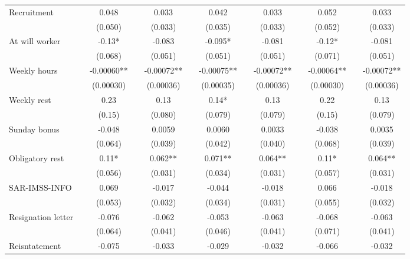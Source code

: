 \begin{tabular}{lcccccccccccc}
Recruitment &       & 0.048 &       & 0.033 &       & 0.042 &       & 0.033 &       & 0.052 &       & 0.033 \\
      &       & (0.050) &       & (0.033) &       & (0.035) &       & (0.033) &       & (0.052) &       & (0.033) \\
At will worker &       & -0.13* &       & -0.083 &       & -0.095* &       & -0.081 &       & -0.12* &       & -0.081 \\
      &       & (0.068) &       & (0.051) &       & (0.051) &       & (0.051) &       & (0.071) &       & (0.051) \\
Weekly hours &       & -0.00060** &       & -0.00072** &       & -0.00075** &       & -0.00072** &       & -0.00064** &       & -0.00072** \\
      &       & (0.00030) &       & (0.00036) &       & (0.00035) &       & (0.00036) &       & (0.00030) &       & (0.00036) \\
Weekly rest &       & 0.23  &       & 0.13  &       & 0.14* &       & 0.13  &       & 0.22  &       & 0.13 \\
      &       & (0.15) &       & (0.080) &       & (0.079) &       & (0.079) &       & (0.15) &       & (0.079) \\
Sunday bonus &       & -0.048 &       & 0.0059 &       & 0.0060 &       & 0.0033 &       & -0.038 &       & 0.0035 \\
      &       & (0.064) &       & (0.039) &       & (0.042) &       & (0.040) &       & (0.068) &       & (0.039) \\
Obligatory rest &       & 0.11* &       & 0.062** &       & 0.071** &       & 0.064** &       & 0.11* &       & 0.064** \\
      &       & (0.056) &       & (0.031) &       & (0.034) &       & (0.031) &       & (0.057) &       & (0.031) \\
SAR-IMSS-INFO &       & 0.069 &       & -0.017 &       & -0.044 &       & -0.018 &       & 0.066 &       & -0.018 \\
      &       & (0.053) &       & (0.032) &       & (0.034) &       & (0.031) &       & (0.055) &       & (0.032) \\
Resignation letter &       & -0.076 &       & -0.062 &       & -0.053 &       & -0.063 &       & -0.068 &       & -0.063 \\
      &       & (0.064) &       & (0.041) &       & (0.046) &       & (0.041) &       & (0.071) &       & (0.041) \\
Reisntatement &       & -0.075 &       & -0.033 &       & -0.029 &       & -0.032 &       & -0.066 &       & -0.032 \\

\end{tabular}
